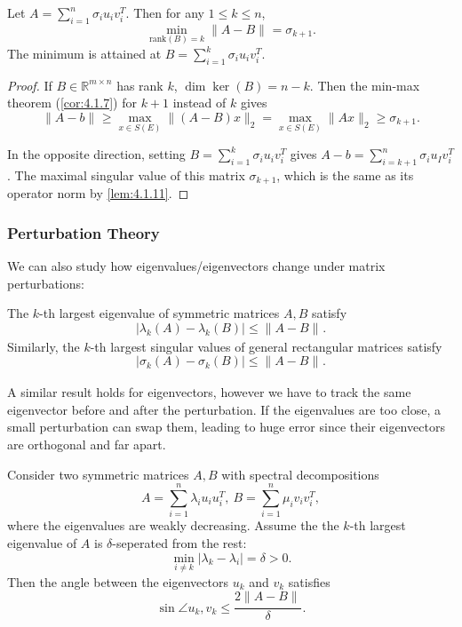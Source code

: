 \begin{theorem}
\label{thm:4.1.13}
Let $A = \sum_{i = 1}^{n} \sigma_i u_i v_i^T$. Then for any $1 \leq k \leq n$,
\[ \min_{\mathrm{rank}(B) = k} \lVert A - B \rVert_{} = \sigma_{k + 1}. \]
The minimum is attained at $B = \sum_{i = 1}^{k} \sigma_i u_i v_i^T$.
\end{theorem}

\begin{proof}
If $B \in \mathbb{R}^{m \times n}$ has rank $k$, $\dim{\ker{(B)}} = n - k$. Then the min-max theorem 
(\cref{cor:4.1.7}) for $k + 1$ instead of $k$ gives 
\[ \lVert A - b \rVert_{} \geq \max_{x \in S(E)} \lVert (A - B)x \rVert_{2} 
= \max_{x \in S(E)} \lVert Ax \rVert_{2} \geq \sigma_{k + 1}. \]

In the opposite direction, setting $B = \sum_{i = 1}^{k} \sigma_i u_i v_i^T$ gives $A - b = 
\sum_{i = k + 1}^{n} \sigma_i u_I v_i^T$. The maximal singular value of this matrix $\sigma_{k + 1}$, 
which is the same as its operator norm by \cref{lem:4.1.11}.
\end{proof}

\subsubsection{Perturbation Theory}
We can also study how eigenvalues/eigenvectors change under matrix perturbations: 
\begin{lemma}
\label{lem:4.1.14}
The $k$-th largest eigenvalue of symmetric matrices $A, B$ satisfy 
\[ |\lambda_k(A) - \lambda_k(B)| \leq \lVert A - B \rVert_{}. \]
Similarly, the $k$-th largest singular values of general rectangular matrices satisfy 
\[ |\sigma_k(A) - \sigma_k(B)| \leq \lVert A - B \rVert_{}. \]
\end{lemma}

A similar result holds for eigenvectors, however we have to track the same eigenvector before and after the 
perturbation. If the eigenvalues are too close, a small perturbation can swap them, leading to huge error 
since their eigenvectors are orthogonal and far apart.

\begin{theorem}
\label{thm:4.1.15}
Consider two symmetric matrices $A, B$ with spectral decompositions 
\[ A = \sum_{i = 1}^{n} \lambda_i u_i u_i^T, \ B = \sum_{i = 1}^{n} \mu_i v_i v_i^T, \]
where the eigenvalues are weakly decreasing. Assume the the $k$-th largest eigenvalue of $A$ is 
$\delta$-seperated from the rest: 
\[ \min_{i \neq k} |\lambda_k - \lambda_i| = \delta > 0. \]
Then the angle between the eigenvectors $u_k$ and $v_k$ satisfies
\[ \sin{\angle u_k, v_k} \leq \frac{2 \lVert A - B \rVert_{}}{\delta}. \]
\end{theorem}

